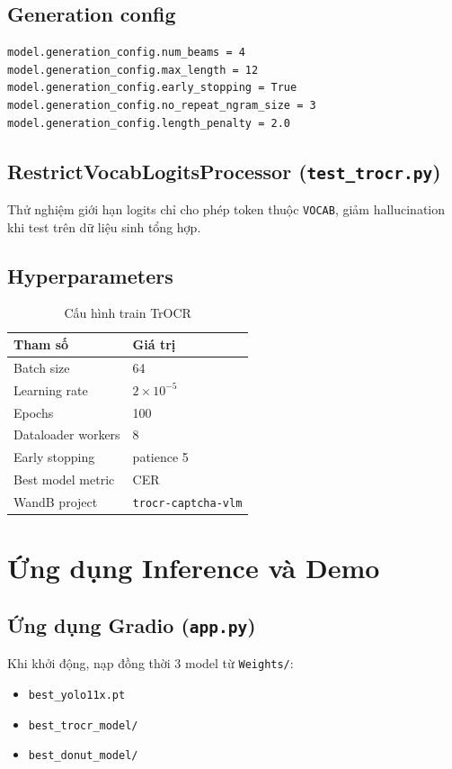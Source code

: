 \documentclass[a4paper,12pt]{report}
\begin{document}
\section{Generation config}
\begin{lstlisting}
model.generation_config.num_beams = 4
model.generation_config.max_length = 12
model.generation_config.early_stopping = True
model.generation_config.no_repeat_ngram_size = 3
model.generation_config.length_penalty = 2.0
\end{lstlisting}

\section{RestrictVocabLogitsProcessor (\texttt{test\_trocr.py})}
Thử nghiệm giới hạn logits chỉ cho phép token thuộc \texttt{VOCAB}, giảm hallucination khi test trên dữ liệu sinh tổng hợp.

\section{Hyperparameters}
\begin{table}[H]
  \centering
  \caption{Cấu hình train TrOCR}
  \begin{tabular}{ll}
    \toprule
    \textbf{Tham số} & \textbf{Giá trị} \\
    \midrule
    Batch size & 64 \\
    Learning rate & $2 \times 10^{-5}$ \\
    Epochs & 100 \\
    Dataloader workers & 8 \\
    Early stopping & patience 5 \\
    Best model metric & CER \\
    WandB project & \texttt{trocr-captcha-vlm} \\
    \bottomrule
  \end{tabular}
\end{table}

\chapter{Ứng dụng Inference và Demo}

\section{Ứng dụng Gradio (\texttt{app.py})}
Khi khởi động, nạp đồng thời 3 model từ \texttt{Weights/}:
\begin{itemize}[leftmargin=*]
  \item \texttt{best\_yolo11x.pt}
  \item \texttt{best\_trocr\_model/}
  \item \texttt{best\_donut\_model/}
\end{itemize}
\end{document}
